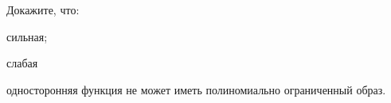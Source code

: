 Докажите, что:
\begin{enumcyr}
    \item сильная;
    \item слабая
\end{enumcyr}
односторонняя функция не может иметь полиномиально ограниченный образ.